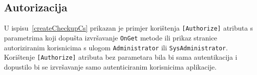 \subsection{Autorizacija}
U ispisu~\ref{createCheckupCs} prikazan je primjer korištenja \texttt{[Authorize]} atributa s parametrima koji dopušta izvršavanje \texttt{OnGet} metode ili prikaz stranice autoriziranim korisnicima s ulogom \texttt{Administrator} ili \texttt{SysAdministrator}. Korištenje \texttt{[Authorize]} atributa bez parametara bila bi sama autentikacija i dopustilo bi se izvršavanje samo autenticiranim korisnicima aplikacije\cite{aspNetCoreAuthentication}.